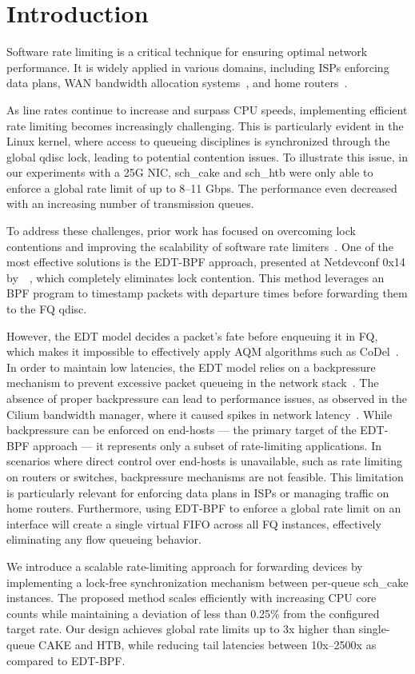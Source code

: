 \section{Introduction}

Software rate limiting is a critical technique for ensuring optimal network performance. It is widely applied in various domains, including ISPs enforcing data plans, WAN bandwidth allocation systems~\cite{bwe}, and home routers~\cite{cake}.

As line rates continue to increase and surpass CPU speeds, implementing efficient rate limiting becomes increasingly challenging. This is particularly evident in the Linux kernel, where access to queueing disciplines is synchronized through the global qdisc lock, leading to potential contention issues.
To illustrate this issue, in our experiments with a 25G NIC, sch\_cake and sch\_htb were only able to enforce a global rate limit of up to 8--11 Gbps. The performance even decreased with an increasing number of transmission queues.

To address these challenges, prior work has focused on overcoming lock contentions and improving the scalability of software rate limiters~\cite{eyeq, carousel, edt-ebpf}. One of the most effective solutions is the EDT-BPF approach, presented at Netdevconf 0x14 by~\citeauthor{edt-ebpf}~\cite{edt-ebpf}, which completely eliminates lock contention. This method leverages an BPF program to timestamp packets with departure times before forwarding them to the FQ qdisc.

However, the EDT model decides a packet's fate before enqueuing it in FQ, which makes it impossible to effectively apply AQM algorithms such as CoDel~\cite{codel}.
In order to maintain low latencies, the EDT model relies on a backpressure mechanism to prevent excessive packet queueing in the network stack~\cite{carousel}. The absence of proper backpressure can lead to performance issues, as observed in the Cilium bandwidth manager, where it caused spikes in network latency~\cite{edt-issue, fifo-in-the-cloud}. While backpressure can be enforced on end-hosts --- the primary target of the EDT-BPF approach --- it represents only a subset of rate-limiting applications.
In scenarios where direct control over end-hosts is unavailable, such as rate limiting on routers or switches, backpressure mechanisms are not feasible. This limitation is particularly relevant for enforcing data plans in ISPs or managing traffic on home routers.
Furthermore, using EDT-BPF to enforce a global rate limit on an interface will create a single virtual FIFO across all FQ instances, effectively eliminating any flow queueing behavior.

We introduce a scalable rate-limiting approach for forwarding devices by implementing a lock-free synchronization mechanism between per-queue sch\_cake instances. The proposed method scales efficiently with increasing CPU core counts while maintaining a deviation of less than 0.25\% from the configured target rate.
Our design achieves global rate limits up to 3x higher than single-queue CAKE and HTB, while reducing tail latencies between 10x--2500x as compared to EDT-BPF.
